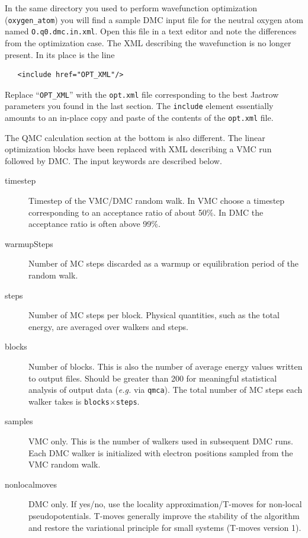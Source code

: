 In the same directory you used to perform wavefunction optimization (\texttt{oxygen\_atom}) you will find a sample DMC input file for the neutral oxygen atom named \texttt{O.q0.dmc.in.xml}.  Open this file in a text editor and note the differences from the optimization case.  The XML describing the wavefunction is no longer present.  In its place is the line
\begin{lstlisting}
   <include href="OPT_XML"/>
\end{lstlisting}
\noindent
Replace ``\texttt{OPT\_XML}'' with the \texttt{opt.xml} file corresponding to the best Jastrow parameters you found in the last section.  The \texttt{include} element essentially amounts to an in-place copy and paste of the contents of the \texttt{opt.xml} file.

The QMC calculation section at the bottom is also different.  The linear optimization blocks have been replaced with XML describing a VMC run followed by DMC.  The input keywords are described below.

\begin{description}
  \item[timestep] Timestep of the VMC/DMC random walk.  In VMC choose a timestep corresponding to an acceptance ratio of about 50\%.  In DMC the acceptance ratio is often above 99\%.
  \item[warmupSteps]  Number of MC steps discarded as a warmup or equilibration period of the random walk.  
  \item[steps] Number of MC steps per block.  Physical quantities, such as the total energy, are averaged over walkers and steps.
  \item[blocks]  Number of blocks.  This is also the number of average energy values written to output files.  Should be greater than 200 for meaningful statistical analysis of output data (\emph{e.g.} via \texttt{qmca}).  The total number of MC steps each walker takes is \texttt{blocks}$\times$\texttt{steps}.
  \item[samples] VMC only. This is the number of walkers used in subsequent DMC runs.  Each DMC walker is initialized with electron positions sampled from the VMC random walk.
  \item[nonlocalmoves] DMC only.  If yes/no, use the locality approximation/T-moves for non-local pseudopotentials.  T-moves generally improve the stability of the algorithm and restore the variational principle for small systems (T-moves version 1).
\end{description}

